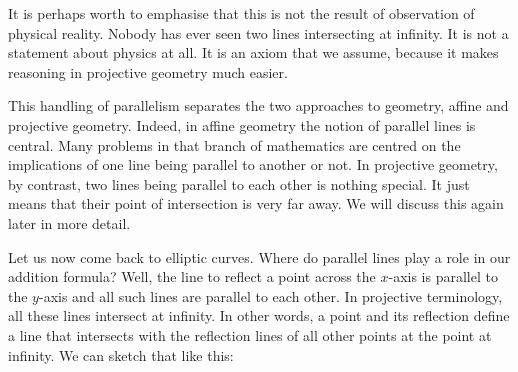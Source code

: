\documentclass[tikz]{scrreprt}
\begin{document}
It is perhaps worth to emphasise that this is not
the result of observation of physical reality.
Nobody has ever seen two lines intersecting at
infinity. It is not a statement about physics at all.
It is an axiom that we assume, because it makes 
reasoning in projective geometry much easier.

This handling of parallelism separates the two 
approaches to geometry, affine and projective
geometry. Indeed, in affine geometry the notion
of parallel lines is central. Many problems
in that branch of mathematics are centred 
on the implications
of one line being parallel to another or not.
In projective geometry, by contrast, two lines
being parallel to each other is nothing special.
It just means that their point of intersection
is very far away. 
We will discuss this again later
in more detail.

Let us now come back to elliptic curves.
Where do parallel lines play a role in our
addition formula? Well, the line to reflect
a point across the $x$-axis is parallel to
the $y$-axis and all such lines are parallel 
to each other. In projective terminology,
all these lines intersect at infinity.
In other words, a point and its reflection
define a line that intersects with the 
reflection lines of all other points at
the point at infinity.
We can sketch that like this:

\begin{center}
\end{center}
\end{document}
